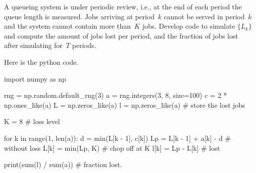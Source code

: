 \documentclass[stochastic-or.tex]{subfiles}
\begin{document}
\begin{exercise}\label{ex:l-115}
A queueing system   is  under periodic review, i.e., at the end of each period the queue length is measured.
Jobs arriving at period~$k$ cannot be served  in period~$k$ and the system cannot contain more than~$K$ jobs.
Develop code to simulate $\{L_k\}$ and compute the amount of jobs lost per period, and  the fraction of jobs lost after simulating for~$T$ periods.

\begin{solution}

Here is the python code.

\begin{python}
import numpy as np

rng = np.random.default_rng(3)
a = rng.integers(3, 8, size=100)
c = 2 * np.ones_like(a)
L = np.zeros_like(a)
l = np.zeros_like(a)  # store the lost jobs

K = 8  # loss level

for k in range(1, len(a)):
    d = min(L[k - 1], c[k])
    Lp = L[k - 1] + a[k] - d  #  without loss
    L[k] = min(Lp, K)  #  chop off at K
    l[k] = Lp - L[k]  #  lost

print(sum(l) / sum(a))  # fraction lost.
\end{python}
\end{solution}
\end{exercise}
\end{document}
